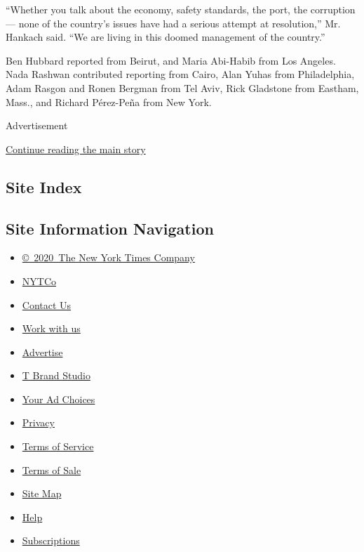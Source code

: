 ``Whether you talk about the economy, safety standards, the port, the
corruption --- none of the country's issues have had a serious attempt
at resolution,'' Mr. Hankach said. ``We are living in this doomed
management of the country.''

Ben Hubbard reported from Beirut, and Maria Abi-Habib from Los Angeles.
Nada Rashwan contributed reporting from Cairo, Alan Yuhas from
Philadelphia, Adam Rasgon and Ronen Bergman from Tel Aviv, Rick
Gladstone from Eastham, Mass., and Richard Pérez-Peña from New York.

Advertisement

\protect\hyperlink{after-bottom}{Continue reading the main story}

\hypertarget{site-index}{%
\subsection{Site Index}\label{site-index}}

\hypertarget{site-information-navigation}{%
\subsection{Site Information
Navigation}\label{site-information-navigation}}

\begin{itemize}
\tightlist
\item
  \href{https://help.nytimes3xbfgragh.onion/hc/en-us/articles/115014792127-Copyright-notice}{©~2020~The
  New York Times Company}
\end{itemize}

\begin{itemize}
\tightlist
\item
  \href{https://www.nytco.com/}{NYTCo}
\item
  \href{https://help.nytimes3xbfgragh.onion/hc/en-us/articles/115015385887-Contact-Us}{Contact
  Us}
\item
  \href{https://www.nytco.com/careers/}{Work with us}
\item
  \href{https://nytmediakit.com/}{Advertise}
\item
  \href{http://www.tbrandstudio.com/}{T Brand Studio}
\item
  \href{https://www.nytimes3xbfgragh.onion/privacy/cookie-policy\#how-do-i-manage-trackers}{Your
  Ad Choices}
\item
  \href{https://www.nytimes3xbfgragh.onion/privacy}{Privacy}
\item
  \href{https://help.nytimes3xbfgragh.onion/hc/en-us/articles/115014893428-Terms-of-service}{Terms
  of Service}
\item
  \href{https://help.nytimes3xbfgragh.onion/hc/en-us/articles/115014893968-Terms-of-sale}{Terms
  of Sale}
\item
  \href{https://spiderbites.nytimes3xbfgragh.onion}{Site Map}
\item
  \href{https://help.nytimes3xbfgragh.onion/hc/en-us}{Help}
\item
  \href{https://www.nytimes3xbfgragh.onion/subscription?campaignId=37WXW}{Subscriptions}
\end{itemize}
